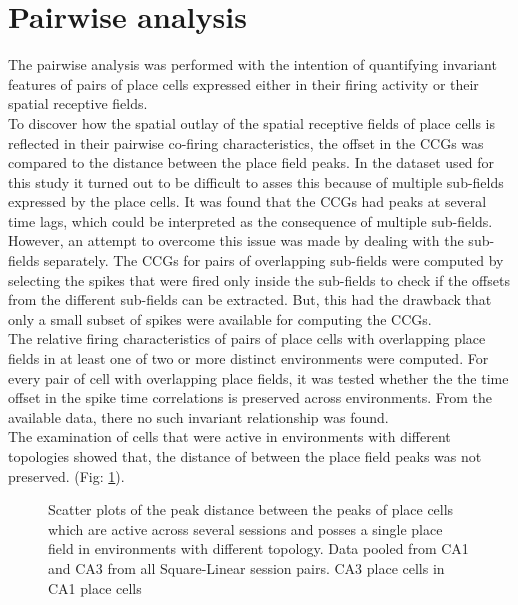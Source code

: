 \section{Pairwise analysis}
The pairwise analysis was performed with the intention of quantifying invariant features of pairs of place cells expressed either in their firing activity or their spatial receptive fields.\\ To discover how the spatial outlay of the spatial receptive fields of place cells is reflected in their pairwise co-firing characteristics, the offset in the CCGs was compared to the distance between the place field peaks. In the dataset used for this study it turned out to be difficult to asses this because of multiple sub-fields expressed by the place cells. It was found that the CCGs had peaks at several time lags, which could be interpreted as the consequence of multiple sub-fields. However, an attempt to overcome this issue was made by dealing with the sub-fields separately.  The CCGs for pairs of overlapping sub-fields were computed by selecting the spikes that were fired only inside the sub-fields to check if the offsets from the different sub-fields can be extracted. But, this had the drawback that only a small subset of spikes were available for computing the CCGs. \\

The relative firing characteristics of pairs of place cells with overlapping place fields in at least one of  two or more distinct environments were computed. For every pair of cell with overlapping place fields, it was tested whether the the time offset in the spike time correlations is preserved across environments. From the available data, there no such invariant relationship  was found.  \\
The examination of cells that were active in environments with different topologies showed that, the distance of between the place field peaks was not preserved. (Fig: \ref{fig:pkDist}).



\begin{figure}[htb!]
\centering
{}
\caption[Place field peak distances]{Scatter plots of the peak distance between the peaks of place cells which are active across several sessions and posses a single place field in environments with different topology. Data pooled from CA1 and CA3  from all Square-Linear session pairs.   CA3 place cells in   CA1 place cells }
\label{fig:pkDist}
\end{figure}

